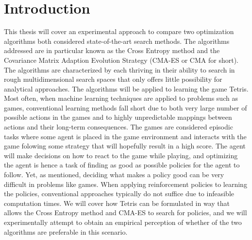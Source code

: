 \section{Introduction \label{sec:intro}}

This thesis will cover an experimental approach 
to compare two optimization algorithms both considered 
state-of-the-art search methods. The algorithms addressed
are in particular known as the Cross Entropy method and 
the Covariance Matrix Adaption Evolution Strategy (CMA-ES or CMA
for short). The algorithms are characterized by each thriving
in their ability to search in rough multidimensional 
search spaces that only offers little possibility 
for analytical approaches.
The algorithms will be applied to 
learning the game Tetris. Most often, when machine learning
techniques are applied to problems such as games, conventional
learning methods fall short due to both  very large number of 
possible actions in the games and to highly unpredictable mappings 
between actions and their long-term consequences. The games 
are considered episodic tasks where some agent is placed
in the game environment and interacts with the game folowing some
strategy that will hopefully result in a high score. 
The agent will make decisions on how to react 
to the game while playing, and optimizing the agent is hence a task of
finding as good as possible policies for the agent to follow. Yet, as mentioned,
deciding what makes a policy good can be very difficult in
problems like games. When applying reinforcement policies to learning
the policies, conventional approaches typically do not suffice 
due to infeasible computation times. We will cover how
Tetris can be formulated in way that allows  the Cross Entropy method 
and CMA-ES to search for policies, and we will experimentally 
attempt to obtain an empirical perception of whether of the two algorithms
are preferable in this scenario.










